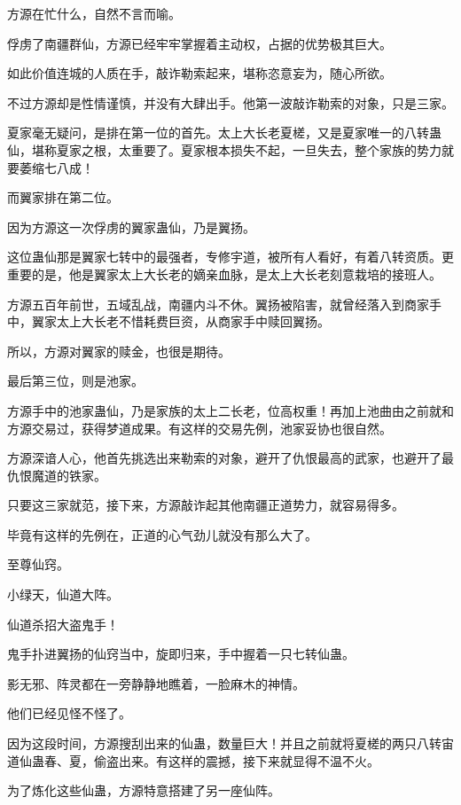 
\begin{this_body}

方源在忙什么，自然不言而喻。

俘虏了南疆群仙，方源已经牢牢掌握着主动权，占据的优势极其巨大。

如此价值连城的人质在手，敲诈勒索起来，堪称恣意妄为，随心所欲。

不过方源却是性情谨慎，并没有大肆出手。他第一波敲诈勒索的对象，只是三家。

夏家毫无疑问，是排在第一位的首先。太上大长老夏槎，又是夏家唯一的八转蛊仙，堪称夏家之根，太重要了。夏家根本损失不起，一旦失去，整个家族的势力就要萎缩七八成！

而翼家排在第二位。

因为方源这一次俘虏的翼家蛊仙，乃是翼扬。

这位蛊仙那是翼家七转中的最强者，专修宇道，被所有人看好，有着八转资质。更重要的是，他是翼家太上大长老的嫡亲血脉，是太上大长老刻意栽培的接班人。

方源五百年前世，五域乱战，南疆内斗不休。翼扬被陷害，就曾经落入到商家手中，翼家太上大长老不惜耗费巨资，从商家手中赎回翼扬。

所以，方源对翼家的赎金，也很是期待。

最后第三位，则是池家。

方源手中的池家蛊仙，乃是家族的太上二长老，位高权重！再加上池曲由之前就和方源交易过，获得梦道成果。有这样的交易先例，池家妥协也很自然。

方源深谙人心，他首先挑选出来勒索的对象，避开了仇恨最高的武家，也避开了最仇恨魔道的铁家。

只要这三家就范，接下来，方源敲诈起其他南疆正道势力，就容易得多。

毕竟有这样的先例在，正道的心气劲儿就没有那么大了。

至尊仙窍。

小绿天，仙道大阵。

仙道杀招大盗鬼手！

鬼手扑进翼扬的仙窍当中，旋即归来，手中握着一只七转仙蛊。

影无邪、阵灵都在一旁静静地瞧着，一脸麻木的神情。

他们已经见怪不怪了。

因为这段时间，方源搜刮出来的仙蛊，数量巨大！并且之前就将夏槎的两只八转宙道仙蛊春、夏，偷盗出来。有这样的震撼，接下来就显得不温不火。

为了炼化这些仙蛊，方源特意搭建了另一座仙阵。


\end{this_body}
